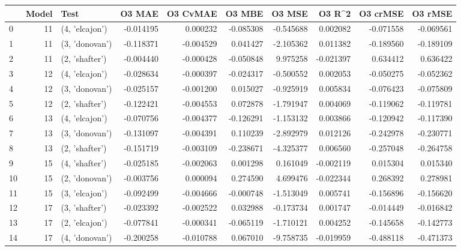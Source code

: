 \begin{tabular}{lrlrrrrrrr}
\toprule
{} &  Model &            Test &    O3 MAE &  O3 CvMAE &    O3 MBE &     O3 MSE &    O3 R\textasciicircum2 &  O3 crMSE &   O3 rMSE \\
\midrule
0  &     11 &  (4, 'elcajon') & -0.014195 &  0.000232 & -0.085308 &  -0.545688 &  0.002082 & -0.071558 & -0.069561 \\
1  &     11 &  (3, 'donovan') & -0.118371 & -0.004529 &  0.041427 &  -2.105362 &  0.011382 & -0.189560 & -0.189109 \\
2  &     11 &  (2, 'shafter') & -0.004440 & -0.000428 & -0.050848 &   9.975258 & -0.021397 &  0.634412 &  0.636422 \\
3  &     12 &  (4, 'elcajon') & -0.028634 & -0.000397 & -0.024317 &  -0.500552 &  0.002053 & -0.050275 & -0.052362 \\
4  &     12 &  (3, 'donovan') & -0.025157 & -0.001200 &  0.015027 &  -0.925919 &  0.005834 & -0.076423 & -0.075809 \\
5  &     12 &  (2, 'shafter') & -0.122421 & -0.004553 &  0.072878 &  -1.791947 &  0.004069 & -0.119062 & -0.119781 \\
6  &     13 &  (4, 'elcajon') & -0.070756 & -0.004377 & -0.126291 &  -1.153132 &  0.003866 & -0.120942 & -0.117390 \\
7  &     13 &  (3, 'donovan') & -0.131097 & -0.004391 &  0.110239 &  -2.892979 &  0.012126 & -0.242978 & -0.230771 \\
8  &     13 &  (2, 'shafter') & -0.151719 & -0.003109 & -0.238671 &  -4.325377 &  0.006560 & -0.257048 & -0.264758 \\
9  &     15 &  (4, 'shafter') & -0.025185 & -0.002063 &  0.001298 &   0.161049 & -0.002119 &  0.015304 &  0.015340 \\
10 &     15 &  (2, 'donovan') & -0.003756 &  0.000094 &  0.274590 &   4.699476 & -0.022344 &  0.268392 &  0.278981 \\
11 &     15 &  (3, 'elcajon') & -0.092499 & -0.004666 & -0.000748 &  -1.513049 &  0.005741 & -0.156896 & -0.156620 \\
12 &     17 &  (3, 'shafter') & -0.023392 & -0.002522 &  0.032988 &  -0.173734 &  0.001747 & -0.014449 & -0.016842 \\
13 &     17 &  (2, 'elcajon') & -0.077841 & -0.000341 & -0.065119 &  -1.710121 &  0.004252 & -0.145658 & -0.142773 \\
14 &     17 &  (4, 'donovan') & -0.200258 & -0.010788 &  0.067010 &  -9.758735 & -0.019959 & -0.488118 & -0.471373 \\

\end{tabular}
